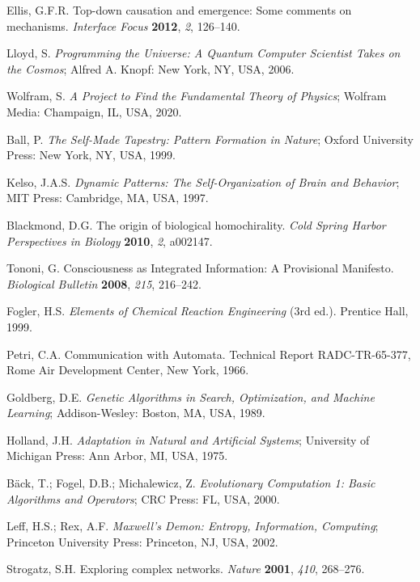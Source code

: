 \documentclass[preprint,12pt]{elsarticle}
\begin{document}
\begin{thebibliography}{999}
Ellis, G.F.R. Top-down causation and emergence: Some comments on mechanisms. \textit{Interface Focus} \textbf{2012}, \textit{2}, 126–140.

Lloyd, S. \textit{Programming the Universe: A Quantum Computer Scientist Takes on the Cosmos}; Alfred A. Knopf: New York, NY, USA, 2006.

Wolfram, S. \textit{A Project to Find the Fundamental Theory of Physics}; Wolfram Media: Champaign, IL, USA, 2020.

Ball, P. \textit{The Self-Made Tapestry: Pattern Formation in Nature}; Oxford University Press: New York, NY, USA, 1999.

Kelso, J.A.S. \textit{Dynamic Patterns: The Self-Organization of Brain and Behavior}; MIT Press: Cambridge, MA, USA, 1997.

Blackmond, D.G. The origin of biological homochirality. \textit{Cold Spring Harbor Perspectives in Biology} \textbf{2010}, \textit{2}, a002147.

Tononi, G. Consciousness as Integrated Information: A Provisional Manifesto. \textit{Biological Bulletin} \textbf{2008}, \textit{215}, 216–242.

Fogler, H.S. \textit{Elements of Chemical Reaction Engineering} (3rd ed.). Prentice Hall, 1999.

Petri, C.A. Communication with Automata. Technical Report RADC-TR-65-377, Rome Air Development Center, New York, 1966.

Goldberg, D.E. \textit{Genetic Algorithms in Search, Optimization, and Machine Learning}; Addison-Wesley: Boston, MA, USA, 1989.

Holland, J.H. \textit{Adaptation in Natural and Artificial Systems}; University of Michigan Press: Ann Arbor, MI, USA, 1975.

Bäck, T.; Fogel, D.B.; Michalewicz, Z. \textit{Evolutionary Computation 1: Basic Algorithms and Operators}; CRC Press: FL, USA, 2000.

Leff, H.S.; Rex, A.F. \textit{Maxwell's Demon: Entropy, Information, Computing}; Princeton University Press: Princeton, NJ, USA, 2002.

Strogatz, S.H. Exploring complex networks. \textit{Nature} \textbf{2001}, \textit{410}, 268–276.


\end{thebibliography}
\end{document}

